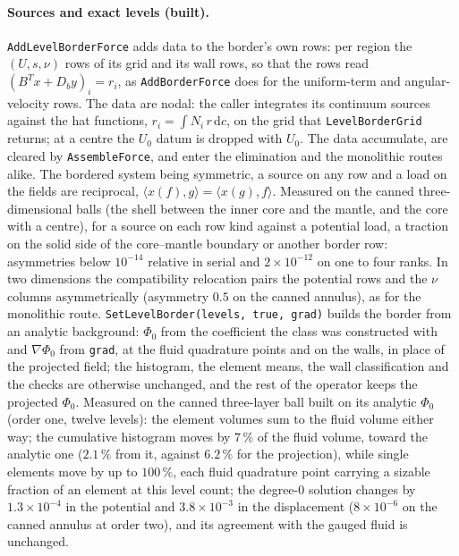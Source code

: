 \documentclass[11pt]{article}
\theoremstyle{definition}
\theoremstyle{remark}
\newcommand{\dc}{\,\mathrm{d}c}
\newcommand{\code}[1]{\texttt{#1}}
\begin{document}
\paragraph{Sources and exact levels (built).}
\code{AddLevelBorderForce} adds data to the border's own rows: per
region the $(U, s, \nu)$ rows of its grid and its wall rows, so that
the rows read $(B^T x + D_b y)_i = r_i$, as \code{AddBorderForce} does
for the uniform-term and angular-velocity rows. The data are nodal: the
caller integrates its continuum sources against the hat functions,
$r_i = \int N_i\,r\dc$, on the grid that \code{LevelBorderGrid}
returns; at a centre the $U_0$ datum is dropped with $U_0$. The data
accumulate, are cleared by \code{AssembleForce}, and enter the
elimination and the monolithic routes alike. The bordered system being
symmetric, a source on any row and a load on the fields are reciprocal,
$\langle x(f), g\rangle = \langle x(g), f\rangle$. Measured on the
canned three-dimensional balls (the shell between the inner core and
the mantle, and the core with a centre), for a source on each row kind
against a potential load, a traction on the solid side of the
core--mantle boundary or another border row: asymmetries below
$10^{-14}$ relative in serial and $2\times10^{-12}$ on one to four
ranks. In two dimensions the compatibility relocation pairs the
potential rows and the $\nu$ columns asymmetrically (asymmetry $0.5$ on
the canned annulus), as for the monolithic route.
\code{SetLevelBorder(levels, true, grad)} builds the border from an
analytic background: $\Phi_0$ from the coefficient the class was
constructed with and $\nabla\Phi_0$ from \code{grad}, at the fluid
quadrature points and on the walls, in place of the projected field;
the histogram, the element means, the wall classification and the
checks are otherwise unchanged, and the rest of the operator keeps the
projected $\Phi_0$. Measured on the canned three-layer ball built on its
analytic $\Phi_0$ (order one, twelve levels): the element volumes sum to
the fluid volume either way; the cumulative histogram moves by $7\,\%$
of the fluid volume, toward the analytic one ($2.1\,\%$ from it,
against $6.2\,\%$ for the projection), while single elements move by up
to $100\,\%$, each fluid quadrature point carrying a sizable fraction
of an element at this level count; the degree-0 solution changes by
$1.3\times10^{-4}$ in the potential and $3.8\times10^{-3}$ in the
displacement ($8\times10^{-6}$ on the canned annulus at order two), and
its agreement with the gauged fluid is unchanged.
\end{document}
